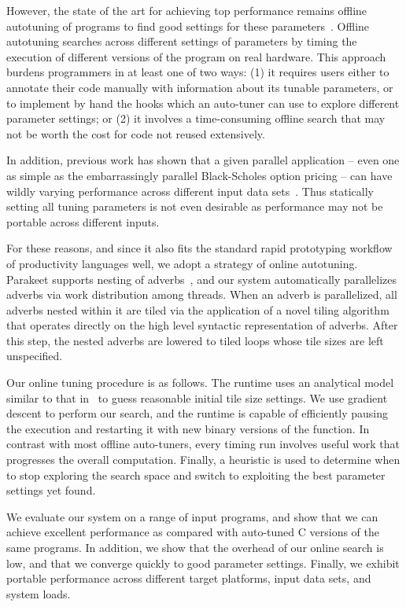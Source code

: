 \documentclass[preprint,9pt]{sigplanconf}
\begin{document}
However, the state of the art for achieving top performance remains offline autotuning of programs to find good settings for these parameters~\cite{Asan06}.  Offline autotuning searches across different settings of parameters by timing the execution of different versions of the program on real hardware.  This approach burdens programmers in at least one of two ways: (1) it requires users either to annotate their code manually with information about its tunable parameters, or to implement by hand the hooks which an auto-tuner can use to explore different parameter settings; or (2) it involves a time-consuming offline search that may not be worth the cost for code not reused extensively.

In addition, previous work has shown that a given parallel application -- even one as simple as the embarrassingly parallel Black-Scholes option pricing -- can have wildly varying performance across different input data sets~\cite{Rama12}.  Thus statically setting all tuning parameters is not even desirable as performance may not be portable across different inputs.

For these reasons, and since it also fits the standard rapid prototyping workflow of productivity languages well, we adopt a strategy of online autotuning.  Parakeet supports nesting of adverbs~\cite{Blel94}, and our system automatically parallelizes adverbs via work distribution among threads.  When an adverb is parallelized, all adverbs nested within it are tiled via the application of a novel tiling algorithm that operates directly on the high level syntactic representation of adverbs.  After this step, the nested adverbs are lowered to tiled loops whose tile sizes are left unspecified.

Our online tuning procedure is as follows.  The runtime uses an analytical model similar to that in~\cite{Shir12} to guess reasonable initial tile size settings.  We use gradient descent to perform our search, and the runtime is capable of efficiently pausing the execution and restarting it with new binary versions of the function.  In contrast with most offline auto-tuners, every timing run involves useful work that progresses the overall computation.  Finally, a heuristic is used to determine when to stop exploring the search space and switch to exploiting the best parameter settings yet found.

We evaluate our system on a range of input programs, and show that we can achieve excellent performance as compared with auto-tuned C versions of the same programs.  In addition, we show that the overhead of our online search is low, and that we converge quickly to good parameter settings.  Finally, we exhibit portable performance across different target platforms, input data sets, and system loads.
\end{document}
